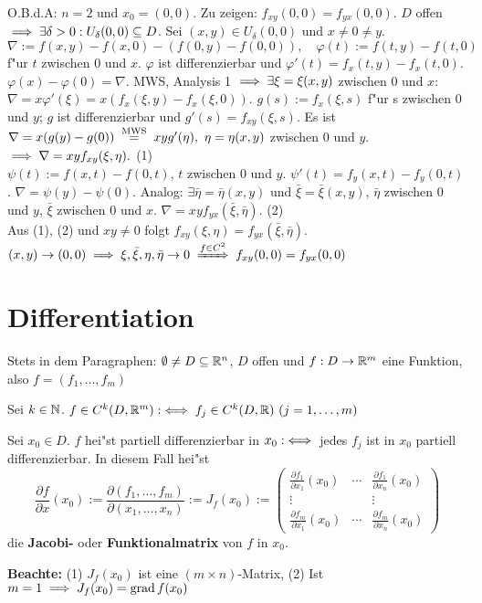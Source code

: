 \documentclass[a4paper,twoside,DIV15,BCOR12mm]{scrbook}
\begin{document}
\begin{beweis}
O.B.d.A: $n=2$ und $x_0=(0,0)$. Zu zeigen: $f_{xy}(0,0)=f_{yx}(0,0)$. $D$ offen $\implies\exists\delta>0: U_\delta(0,0)\subseteq D$. Sei $(x,y) \in U_\delta(0,0)$ und $x\ne 0\ne y$. $$\nabla:=f(x,y)-f(x,0)-(f(0,y)-f(0,0)),\quad\varphi(t):=f(t,y)-f(t,0)$$ f"ur $t$ zwischen $0$ und $x$. $\varphi$ ist differenzierbar und $\varphi'(t)=f_x(t,y)-f_x(t,0)$. $\varphi(x)-\varphi(0)=\nabla$. MWS, Analysis 1 $\implies\exists\xi=\xi(x,y)$ zwischen $0$ und $x$: $\nabla=x\varphi'(\xi)=x(f_x(\xi,y)-f_x(\xi,0))$. $g(s):=f_x(\xi,s)$ f"ur s zwischen $0$ und $y$; $g$ ist differenzierbar und $g'(s)=f_{xy}(\xi,s)$. Es ist $\nabla=x(g(y)-g(0))\gleichnach{MWS}xyg'(\eta),\ \eta=\eta(x,y)$ zwischen $0$ und $y$. $\implies \nabla=xyf_{xy}(\xi,\eta).$ (1)\\
$\psi(t):=f(x,t)-f(0,t)$, $t$ zwischen $0$ und $y$. $\psi'(t)=f_y(x,t)-f_y(0,t)$. $\nabla=\psi(y)-\psi(0)$. Analog: $\exists \bar\eta=\bar\eta(x,y)$ und $\bar\xi=\bar\xi(x,y)$, $\bar\eta$ zwischen $0$ und $y$, $\bar\xi$ zwischen $0$ und $x$. $\nabla=xyf_{yx}(\bar\xi,\bar\eta).$ (2)\\
Aus (1), (2) und $xy\ne0$ folgt $f_{xy}(\xi,\eta)=f_{yx}(\bar\xi,\bar\eta)$. $(x,y)\to(0,0)\folgt\xi,\bar\xi,\eta,\bar\eta\to 0\folgtwegen{f\in C^2}f_{xy}(0,0)=f_{yx}(0,0)$
\end{beweis}

\chapter{Differentiation}
\def\grad{\mathop{\rm grad}\nolimits}

\begin{vereinbarung}
Stets in dem Paragraphen: $\emptyset\ne D\subseteq\mathbb{R}^n$, $D$ offen und $f:D\to\mathbb{R}^m$ eine Funktion, also $f=(f_1,\ldots,f_m)$
\end{vereinbarung}

\begin{definition*}
\begin{liste}
\item Sei $k\in\mathbb{N}$. $f\in C^k(D,\MdR^m) :\equizu f_j\in C^k(D,\MdR)\ (j=1,\ldots,m)$
\item Sei $x_0\in D$. $f$ hei"st partiell differenzierbar in $x_0 :\iff$ jedes $f_j$ ist in $x_0$ partiell differenzierbar. In diesem Fall hei"st
$$\frac{\partial f}{\partial x}(x_0):=\frac{\partial(f_1,\ldots,f_m)}{\partial(x_1,\ldots,x_n)}:=J_f(x_0):=\begin{pmatrix}
\frac{\partial f_1}{\partial x_1}(x_0) & \cdots & \frac{\partial f_1}{\partial x_n}(x_0) \\
\vdots & & \vdots \\
\frac{\partial f_m}{\partial x_1}(x_0) & \cdots & \frac{\partial f_m}{\partial x_n}(x_0)
\end{pmatrix}$$
die \textbf{Jacobi-} oder \textbf{Funktionalmatrix} von $f$ in $x_0$.
\end{liste}
\textbf{Beachte:}
(1) $J_f(x_0)$ ist eine $(m \times n)$-Matrix, (2) Ist $m=1\folgt J_f(x_0)=\grad f(x_0)$
\end{definition*}
\end{document}
